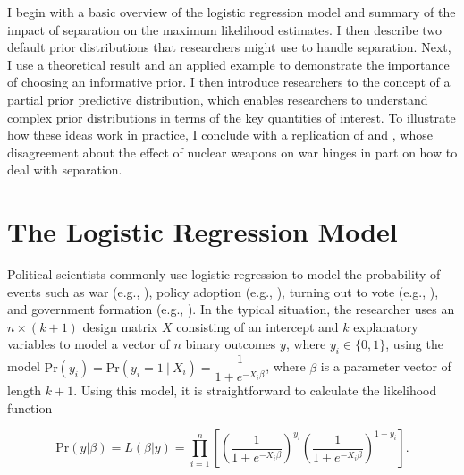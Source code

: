 \documentclass[12pt]{article}
\begin{document}
I begin with a basic overview of the logistic regression model and summary of the impact of separation on the maximum likelihood estimates. I then describe two default prior distributions that researchers might use to handle separation. Next, I use a theoretical result and an applied example to demonstrate the importance of choosing an informative prior. I then introduce researchers to the concept of a partial prior predictive distribution, which enables researchers to understand complex prior distributions in terms of the key quantities of interest. To illustrate how these ideas work in practice, I conclude with a replication of \cite{Rauchhaus2009} and \cite{BellMiller2014}, whose disagreement about the effect of nuclear weapons on war hinges in part on how to deal with separation.

\section*{The Logistic Regression Model}

Political scientists commonly use logistic regression to model the probability of events such as war (e.g., \citealt{Fearon1994}), policy adoption (e.g., \citealt{BerryBerry1990}), turning out to vote (e.g., \citealt{WolfingerRosenstone1980}), and government formation (e.g., \citealt{MartinStevenson2001}). In the typical situation, the researcher uses an $n \times (k + 1)$ design matrix $X$ consisting of an intercept and $k$ explanatory variables to model a vector of $n$ binary outcomes $y$, where $y_i \in \{0, 1\}$, using the model $\text{Pr}(y_i) = \text{Pr}(y_i = 1~|~ X_i) = \dfrac{1}{1 + e^{-X_i\beta}}$, where $\beta$ is a parameter vector of length $k + 1$. Using this model, it is straightforward to calculate the likelihood function 

\begin{equation}\nonumber
\text{Pr}(y | \beta) = L(\beta | y) = \displaystyle \prod_{i = 1}^n \left[\left( \dfrac{1}{1 + e^{-X_i\beta}}\right)^{y_i}\left( \dfrac{1}{1 + e^{-X_i\beta}}\right)^{1 - y_i}\right]\text{.}
\end{equation}

%
%
%
\end{document}
